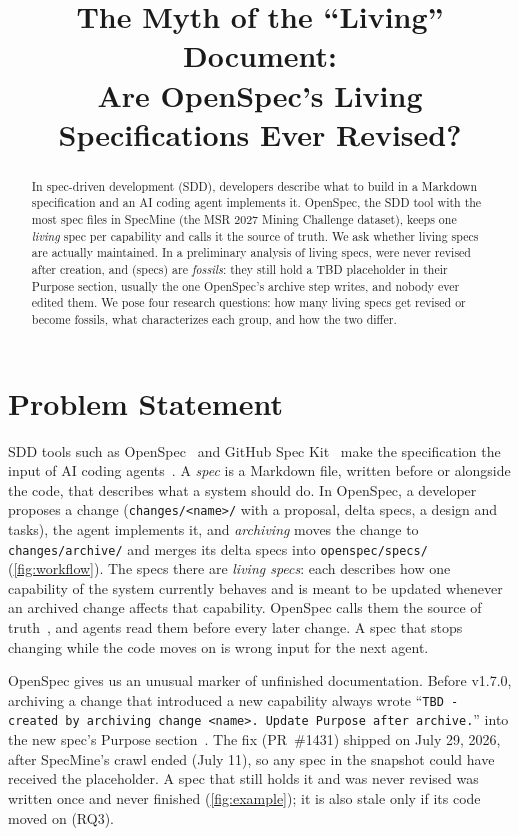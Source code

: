 \documentclass[10pt, conference]{IEEEtran}
\title{The Myth of the ``Living'' Document:\\Are OpenSpec's Living Specifications Ever Revised?}
\author{\IEEEauthorblockN{Tran Vo \quad Thanh Nghiep Quan}
\IEEEauthorblockA{\emph{Dep. of Computer and Software Engineering, Polytechnique Montr\'eal}, Montr\'eal, Canada}}
\newcommand{\fp}[1]{\texttt{#1}}
\begin{document}
\maketitle

\begin{abstract}
In spec-driven development (SDD), developers describe what to build in a Markdown
specification and an AI coding agent implements it. OpenSpec, the SDD tool with the most
spec files in SpecMine (the MSR 2027 Mining Challenge dataset), keeps one \emph{living} spec
per capability and calls it the source of truth.
We ask whether living specs are actually maintained. In a preliminary analysis of
\numLiving living specs, \pctNeverRevised were never revised after creation, and
\pctFossil (\numFossils specs) are \emph{fossils}: they still hold a TBD placeholder in
their Purpose section, usually the one OpenSpec's archive step writes, and nobody ever
edited them.
We pose four research questions: how many living specs get revised or become fossils,
what characterizes each group, and how the two differ.
\end{abstract}

\section{Problem Statement}
\label{sec:statement}

SDD tools such as OpenSpec~\cite{openspec} and GitHub Spec Kit~\cite{speckit} make the
specification the input of AI coding agents~\cite{boeckeler2025}. A \emph{spec} is a
Markdown file, written before or alongside the code, that describes what a system should
do. In OpenSpec, a developer
proposes a change (\fp{changes/<name>/} with a proposal, delta specs, a design and tasks),
the agent implements it, and \emph{archiving} moves the change to \fp{changes/archive/}
and merges its delta specs into \fp{openspec/specs/} (\cref{fig:workflow}). The specs there are \emph{living
specs}: each describes how one capability of the system currently behaves and is meant to
be updated whenever an archived change affects that capability. OpenSpec calls them the
source of truth~\cite{openspec}, and agents read them before every later change. A spec
that stops changing while the code moves on is wrong input for the next agent.

OpenSpec gives us an unusual marker of unfinished documentation. Before v1.7.0, archiving a
change that introduced a new capability always wrote
``\texttt{TBD - created by archiving change <name>. Update Purpose after archive.}'' into the
new spec's Purpose section~\cite{openspec_pr1431}. The fix (PR~\#1431) shipped on
July 29, 2026, after SpecMine's crawl ended (July 11), so any spec in the snapshot could
have received the placeholder. A spec that still holds it and was never revised was written
once and never finished (\cref{fig:example}); it is also stale only if its code moved on (RQ3).
\end{document}

